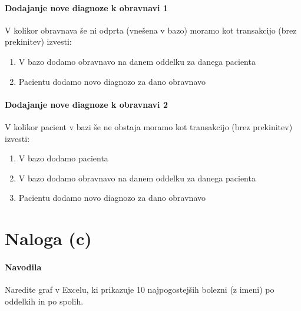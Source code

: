 \documentclass[a4paper,12pt]{report}
\begin{document}
\paragraph{Dodajanje nove diagnoze k obravnavi 1}
V kolikor obravnava še ni odprta (vnešena v bazo) moramo kot transakcijo (brez prekinitev) izvesti:
\begin{enumerate}
   \item V bazo dodamo obravnavo na danem oddelku za danega pacienta
   \item Pacientu dodamo novo diagnozo za dano obravnavo
\end{enumerate}

\paragraph{Dodajanje nove diagnoze k obravnavi 2}
V kolikor pacient v bazi še ne obstaja moramo kot transakcijo (brez prekinitev) izvesti:
\begin{enumerate}
   \item V bazo dodamo pacienta
   \item V bazo dodamo obravnavo na danem oddelku za danega pacienta
   \item Pacientu dodamo novo diagnozo za dano obravnavo
\end{enumerate}

\pagebreak
\section*{Naloga (c)}
\paragraph{Navodila}
Naredite graf v Excelu, ki prikazuje 10 najpogostejših bolezni (z imeni) po oddelkih in po spolih.
\end{document}
